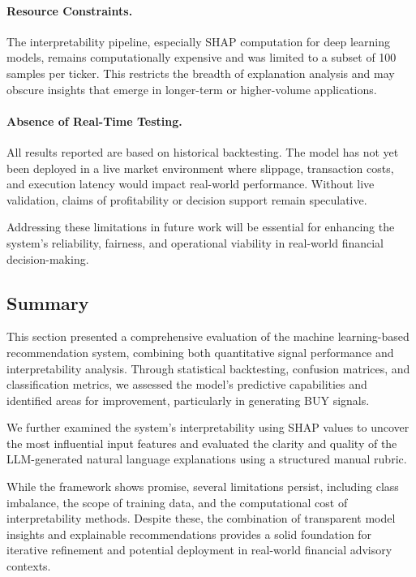 \paragraph{Resource Constraints.}  
The interpretability pipeline, especially SHAP computation for deep learning models, remains computationally expensive and was limited to a subset of 100 samples per ticker. This restricts the breadth of explanation analysis and may obscure insights that emerge in longer-term or higher-volume applications.

\paragraph{Absence of Real-Time Testing.}  
All results reported are based on historical backtesting. The model has not yet been deployed in a live market environment where slippage, transaction costs, and execution latency would impact real-world performance. Without live validation, claims of profitability or decision support remain speculative.

\bigskip

Addressing these limitations in future work will be essential for enhancing the system’s reliability, fairness, and operational viability in real-world financial decision-making.

\subsection{Summary}

This section presented a comprehensive evaluation of the machine learning-based recommendation system, combining both quantitative signal performance and interpretability analysis. Through statistical backtesting, confusion matrices, and classification metrics, we assessed the model’s predictive capabilities and identified areas for improvement, particularly in generating BUY signals.

We further examined the system’s interpretability using SHAP values to uncover the most influential input features and evaluated the clarity and quality of the LLM-generated natural language explanations using a structured manual rubric.

While the framework shows promise, several limitations persist, including class imbalance, the scope of training data, and the computational cost of interpretability methods. Despite these, the combination of transparent model insights and explainable recommendations provides a solid foundation for iterative refinement and potential deployment in real-world financial advisory contexts.
